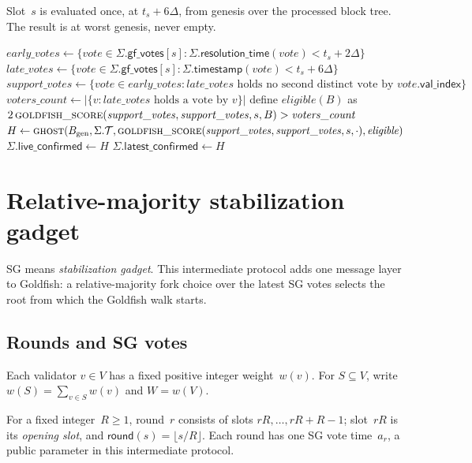 \documentclass{article}
\theoremstyle{plain}
\theoremstyle{definition}
\theoremstyle{remark}
\newcommand{\genesis}{B_{\mathrm{gen}}}
\newcommand{\valindex}{\mathsf{val\_index}}
\newcommand{\round}{\mathsf{round}}
\newcommand{\T}{\mathcal T}
\newcommand{\gfPool}{\mathsf{gf\_votes}}
\newcommand{\fname}[1]{\text{\textsc{#1}}}
\newcommand{\liveConfirmed}{\mathsf{live\_confirmed}}
\newcommand{\latestConfirmed}{\mathsf{latest\_confirmed}}
\newcommand{\timestamp}{\mathsf{timestamp}}
\newcommand{\resolutionTime}{\mathsf{resolution\_time}}
\begin{document}
Slot~$s$ is evaluated once, at $t_s+6\Delta$, from genesis over the
processed block tree.
The result is at worst genesis, never empty.

\noindent\begin{minipage}{\linewidth}
\label{alg:confirmation}
{\footnotesize
\begin{algorithmic}[1]
  \State $\mathit{early\_votes}\gets\{\mathit{vote}\in\Sigma.\gfPool[s]:
    \Sigma.\resolutionTime(\mathit{vote})<t_s+2\Delta\}$
  \State $\mathit{late\_votes}\gets\{\mathit{vote}\in\Sigma.\gfPool[s]:
    \Sigma.\timestamp(\mathit{vote})<t_s+6\Delta\}$
  \State $\mathit{support\_votes}\gets
    \{\mathit{vote}\in\mathit{early\_votes}:
    \mathit{late\_votes}\text{ holds no second distinct vote by }
    \mathit{vote}.\valindex\}$
  \State $\mathit{voters\_count}\gets
    |\{v:\mathit{late\_votes}\text{ holds a vote by }v\}|$
  \State define $\mathit{eligible}(B)$ as
    $2\,\Call{goldfish\_score}{\mathit{support\_votes},
      \mathit{support\_votes},s,B}>\mathit{voters\_count}$
  \State $H\gets\Call{ghost}{\genesis,\Sigma.\T,
    \fname{goldfish\_score}(\mathit{support\_votes},
      \mathit{support\_votes},s,\cdot),\mathit{eligible}}$
  \State $\Sigma.\liveConfirmed\gets H$
  \If{$\Sigma.\latestConfirmed\preceq H$}
    \State $\Sigma.\latestConfirmed\gets H$
  \EndIf
\EndFunction
\end{algorithmic}
}
\end{minipage}

\section{Relative-majority stabilization gadget}\label{sec:majority-sg}

SG means \emph{stabilization gadget}.  This intermediate protocol adds one
message layer to Goldfish: a relative-majority fork choice over the latest SG
votes selects the root from which the Goldfish walk starts.

\subsection{Rounds and SG votes}\label{sec:sg-schedule}

Each validator $v\in V$ has a fixed positive integer weight~$w(v)$.  For
$S\subseteq V$, write $w(S)=\sum_{v\in S}w(v)$ and $W=w(V)$.

For a fixed integer~$R\geq1$, round~$r$ consists of slots $rR,\ldots,rR+R-1$;
slot~$rR$ is its \emph{opening slot}, and $\round(s)=\lfloor s/R\rfloor$.
Each round has one SG vote time~$a_r$, a public parameter in this
intermediate protocol.
\end{document}
